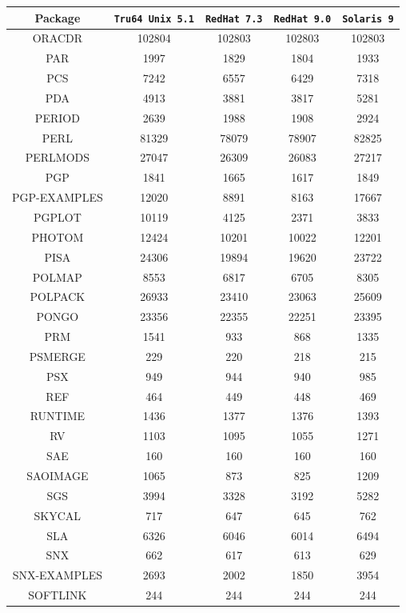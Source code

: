 \documentclass[twoside,11pt]{article}
\renewcommand{\_}{\texttt{\symbol{95}}}
\begin{document}
\begin{table}[p]
\begin{center}
\begin{tabular}{|c|c|c|c|c|}
\hline \hline
\textbf{Package} & \texttt{Tru64 Unix 5.1} & \texttt{RedHat 7.3} & \texttt{RedHat 9.0} & \texttt{Solaris 9} \\ \hline \hline
\hline
ORACDR & 102804 & 102803 & 102803 & 102803 \\ 
PAR & 1997 & 1829 & 1804 & 1933 \\ 
PCS & 7242 & 6557 & 6429 & 7318 \\ 
PDA & 4913 & 3881 & 3817 & 5281 \\ 
PERIOD & 2639 & 1988 & 1908 & 2924 \\ 
PERL & 81329 & 78079 & 78907 & 82825 \\ 
PERLMODS & 27047 & 26309 & 26083 & 27217 \\ 
PGP & 1841 & 1665 & 1617 & 1849 \\ 
PGP-EXAMPLES & 12020 & 8891 & 8163 & 17667 \\ 
PGPLOT & 10119 & 4125 & 2371 & 3833 \\ 
PHOTOM & 12424 & 10201 & 10022 & 12201 \\ 
PISA & 24306 & 19894 & 19620 & 23722 \\ 
POLMAP & 8553 & 6817 & 6705 & 8305 \\ 
POLPACK & 26933 & 23410 & 23063 & 25609 \\ 
PONGO & 23356 & 22355 & 22251 & 23395 \\ 
PRM & 1541 & 933 & 868 & 1335 \\ 
PSMERGE & 229 & 220 & 218 & 215 \\ 
PSX & 949 & 944 & 940 & 985 \\ 
REF & 464 & 449 & 448 & 469 \\ 
RUNTIME & 1436 & 1377 & 1376 & 1393 \\ 
RV & 1103 & 1095 & 1055 & 1271 \\ 
SAE & 160 & 160 & 160 & 160 \\ 
SAOIMAGE & 1065 & 873 & 825 & 1209 \\ 
SGS & 3994 & 3328 & 3192 & 5282 \\ 
SKYCAL & 717 & 647 & 645 & 762 \\ 
SLA & 6326 & 6046 & 6014 & 6494 \\ 
SNX & 662 & 617 & 613 & 629 \\ 
SNX-EXAMPLES & 2693 & 2002 & 1850 & 3954 \\ 
SOFTLINK & 244 & 244 & 244 & 244 \\ 

\end{tabular}
\end{center}
\end{table}
\end{document}
